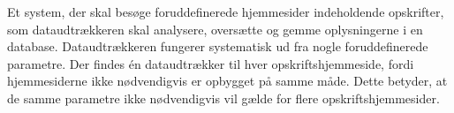 {Et system, der skal besøge foruddefinerede hjemmesider indeholdende opskrifter, som dataudtrækkeren skal analysere, oversætte og gemme oplysningerne i en database.}
{Dataudtrækkeren fungerer systematisk ud fra nogle foruddefinerede parametre. Der findes én dataudtrækker til hver opskriftshjemmeside, fordi hjemmesiderne ikke nødvendigvis er opbygget på samme måde. Dette betyder, at de samme parametre ikke nødvendigvis vil gælde for flere opskriftshjemmesider.}
{}